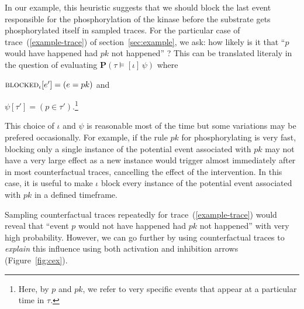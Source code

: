 In our example, this heuristic suggests that we should
block the last event responsible for the phosphorylation of the kinase
before the substrate gets phosphorylated itself in sampled traces. For
the particular case of trace~(\ref{example-trace}) of
section~\ref{sec:example}, we ask: how likely is it that ``$p$ would
have happened had $pk$ not happened'' ?  This can be translated
literaly in the question of evaluating
$\mathbf{P}(\tau \!\models\! [\iota] \, \psi)$ where
\begin{inparaenum}[(i)]
\item ${\textsc{blocked}}_{\iota}[e'] = (e = pk)$ and
\item $\psi[\tau'] = (p \in \tau')$.\footnote{Here, by $p$ and $pk$,
    we refer to very specific events that appear at a particular time
    in $\tau$.}
\end{inparaenum}
This choice of $\iota$ and $\psi$ is reasonable most of the
time but some variations may be prefered occasionally. For example, if
the rule $pk$ for phosphorylating is very fast, blocking only a single
instance of the potential event associated with $pk$ may not have a
very large effect as a new instance would trigger almost immediately
after in most counterfactual traces, cancelling the effect of the
intervention.  In this case, it is useful to make $\iota$ block every
instance of the potential event associated with $pk$ in a defined
timeframe.

Sampling counterfactual traces repeatedly for
trace~(\ref{example-trace}) would reveal that ``event $p$ would not
have happened had $pk$ not happened'' with very high probability.
However, we can go further by using counterfactual traces to
\textit{explain} this influence using both activation and inhibition
arrows (Figure~\ref{fig:cex}).